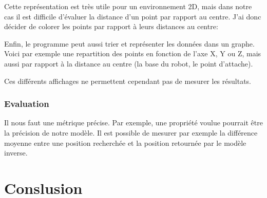 \documentclass[11pt,french]{article}
\begin{document}
Cette représentation est très utile pour un environnement 2D, mais dans notre cas il est difficile d'évaluer la distance d'un point par rapport au centre. J'ai donc décider de colorer les points par rapport à leurs distances au centre:


Enfin, le programme peut aussi trier et représenter les données dans un graphe. Voici par exemple une repartition des points en fonction de l'axe X, Y ou Z, mais aussi par rapport à la distance au centre (la base du robot, le point d'attache).


Ces différents affichages ne permettent cependant pas de mesurer les résultats.

\subsubsection{Evaluation}

Il nous faut une métrique précise. Par exemple, une propriété voulue pourrait être la précision de notre modèle. Il est possible de mesurer par exemple la différence moyenne entre une position recherchée et la position retournée par le modèle inverse. 

\section{Conslusion}
\end{document}
